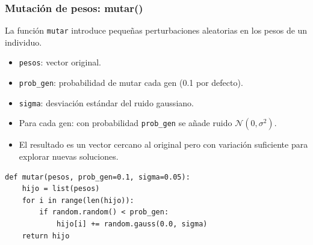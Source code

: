 \documentclass[
	11pt, %
]{beamer}
\begin{document}

\begin{frame}[fragile]
\frametitle{Mutación de pesos: mutar()}

La función \texttt{mutar} introduce pequeñas perturbaciones aleatorias en los
pesos de un individuo.

\begin{itemize}
    \item \texttt{pesos}: vector original.
    \item \texttt{prob\_gen}: probabilidad de mutar cada gen (0.1 por defecto).
    \item \texttt{sigma}: desviación estándar del ruido gaussiano.
    \item Para cada gen:
        con probabilidad \texttt{prob\_gen} se añade ruido \(\mathcal{N}(0,\sigma^2)\).
    \item El resultado es un vector cercano al original pero con variación
          suficiente para explorar nuevas soluciones.
\end{itemize}

{\scriptsize
\begin{verbatim}
def mutar(pesos, prob_gen=0.1, sigma=0.05):
    hijo = list(pesos)
    for i in range(len(hijo)):
        if random.random() < prob_gen:
            hijo[i] += random.gauss(0.0, sigma)
    return hijo
\end{verbatim}
}
\end{frame}


\end{document}

